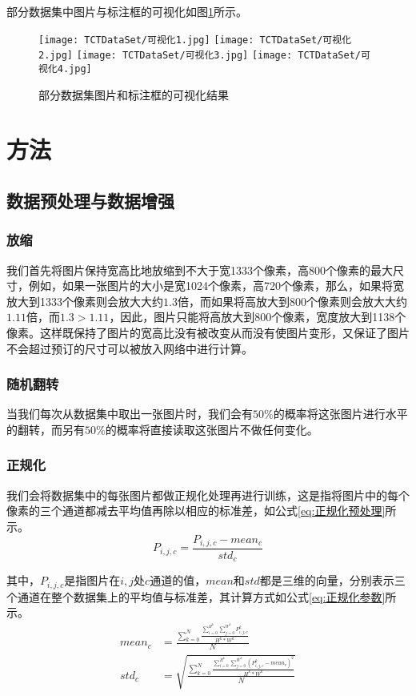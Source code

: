 部分数据集中图片与标注框的可视化如图\ref{pic:数据集可视化}所示。
\begin{figure}[htb]
    \centering
    \texttt{[image: TCTDataSet/可视化1.jpg]}
    \texttt{[image: TCTDataSet/可视化2.jpg]}
    \texttt{[image: TCTDataSet/可视化3.jpg]}
    \texttt{[image: TCTDataSet/可视化4.jpg]}
    \caption{部分数据集图片和标注框的可视化结果}
    \label{pic:数据集可视化}
\end{figure}

\section{方法}
\subsection{数据预处理与数据增强}
\subsubsection{放缩}
\par 我们首先将图片保持宽高比地放缩到不大于宽1333个像素，高800个像素的最大尺寸，例如，如果一张图片的大小是宽1024个像素，高720个像素，那么，如果将宽放大到1333个像素则会放大大约$1.3$倍，而如果将高放大到800个像素则会放大大约$1.11$倍，而$1.3>1.11$，因此，图片只能将高放大到800个像素，宽度放大到1138个像素。这样既保持了图片的宽高比没有被改变从而没有使图片变形，又保证了图片不会超过预订的尺寸可以被放入网络中进行计算。
\subsubsection{随机翻转}
\par 当我们每次从数据集中取出一张图片时，我们会有$50\%$的概率将这张图片进行水平的翻转，而另有$50\%$的概率将直接读取这张图片不做任何变化。
\subsubsection{正规化}
\par 我们会将数据集中的每张图片都做正规化处理再进行训练，这是指将图片中的每个像素的三个通道都减去平均值再除以相应的标准差，如公式\ref{eq:正规化预处理}所示。
\begin{equation}
    P_{i,j,c}=\frac{P_{i,j,c}-mean_{c}}{std_{c}}
    \label{eq:正规化预处理}
\end{equation}

\par 其中，$P_{i,j,c}$是指图片在$i,j$处$c$通道的值，$mean$和$std$都是三维的向量，分别表示三个通道在整个数据集上的平均值与标准差，其计算方式如公式\ref{eq:正规化参数}所示。
\begin{equation}
    \begin{aligned}
        mean_c&=\frac{\sum_{k=0}^N\frac{\sum_{i=0}^{H^k}\sum_{j=0}^{W^k}P_{i,j,c}^k}{H^k*W^k}}{N}\\
        std_c&=\sqrt{\frac{\sum_{k=0}^N\frac{\sum_{i=0}^{H^k}\sum_{j=0}^{W^k}(P_{i,j,c}^k-mean_c)^2}{H^k*W^k}}{N}}
    \end{aligned}
    \label{eq:正规化参数}
\end{equation}

